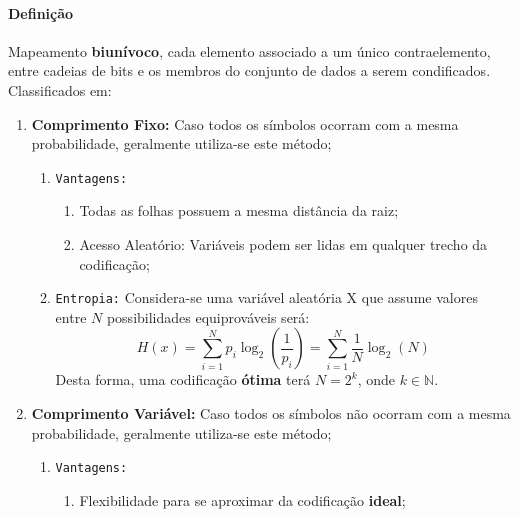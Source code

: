 \documentclass{article}
\begin{document}
            \paragraph{Definição}Mapeamento \textbf{biunívoco}, cada elemento associado a um único contraelemento, entre cadeias de bits e os membros do conjunto de dados a serem condificados. Classificados em:
                \begin{enumerate}[rightmargin = \leftmargin]
                    \item \textbf{Comprimento Fixo:} Caso todos os símbolos ocorram com a mesma probabilidade, geralmente utiliza-se este método;
                        \begin{enumerate}[noitemsep, rightmargin = \leftmargin]
                            \item \texttt{Vantagens:}
                                \begin{enumerate}[noitemsep, rightmargin = \leftmargin]
                                    \item Todas as folhas possuem a mesma distância da raiz;
                                    \item Acesso Aleatório: Variáveis podem ser lidas em qualquer trecho da codificação;
                                \end{enumerate}

                            \item \texttt{Entropia:} Considera-se uma variável aleatória X que assume valores entre $N$ possibilidades equiprováveis será:
                                \begin{equation}
                                    \boxed{
                                        H(x) = \sum_{i=1}^{N}p_{i}\log_{2}\left(\frac{1}{p_{i}}\right) = \sum_{i=1}^{N}\frac{1}{N}\log_{2}(N)
                                    }
                                \end{equation}
                            Desta forma, uma codificação \textbf{ótima} terá $N = 2^{k}$, onde $k \in \mathbb{N}$.
                        \end{enumerate}

                    \item \textbf{Comprimento Variável:} Caso todos os símbolos não ocorram com a mesma probabilidade, geralmente utiliza-se este método;
                        \begin{enumerate}[noitemsep, rightmargin = \leftmargin]
                            \item \texttt{Vantagens:}
                                \begin{enumerate}[noitemsep, rightmargin = \leftmargin]
                                    \item Flexibilidade para se aproximar da codificação \textbf{ideal};
                                \end{enumerate}


\end{enumerate}
\end{enumerate}
\end{document}
